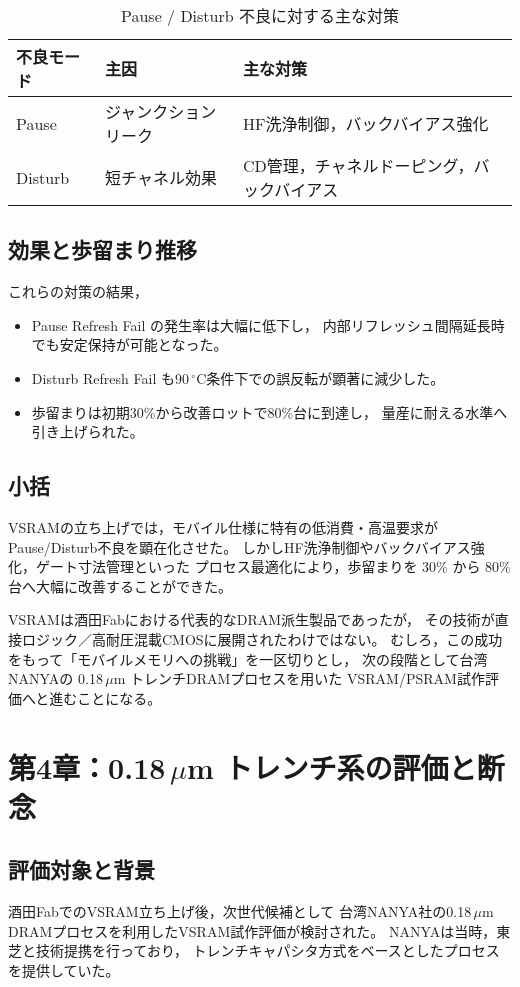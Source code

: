 \documentclass[conference]{IEEEtran}
\begin{document}
\begin{table}[t]
\centering
\caption{Pause / Disturb 不良に対する主な対策}
\begin{tabular}{lll}
\toprule
不良モード & 主因 & 主な対策 \\
\midrule
Pause & ジャンクションリーク & HF洗浄制御，バックバイアス強化 \\
Disturb & 短チャネル効果 & CD管理，チャネルドーピング，バックバイアス \\
\bottomrule
\end{tabular}
\end{table}

\subsection{効果と歩留まり推移}
これらの対策の結果，
\begin{itemize}
  \item Pause Refresh Fail の発生率は大幅に低下し，
        内部リフレッシュ間隔延長時でも安定保持が可能となった。
  \item Disturb Refresh Fail も90\,$^\circ$C条件下での誤反転が顕著に減少した。
  \item 歩留まりは初期30\%から改善ロットで80\%台に到達し，
        量産に耐える水準へ引き上げられた。
\end{itemize}

\subsection{小括}
VSRAMの立ち上げでは，モバイル仕様に特有の低消費・高温要求が
Pause/Disturb不良を顕在化させた。
しかしHF洗浄制御やバックバイアス強化，ゲート寸法管理といった
プロセス最適化により，歩留まりを 30\% から 80\%台へ大幅に改善することができた。

VSRAMは酒田Fabにおける代表的なDRAM派生製品であったが，
その技術が直接ロジック／高耐圧混載CMOSに展開されたわけではない。
むしろ，この成功をもって「モバイルメモリへの挑戦」を一区切りとし，
次の段階として台湾NANYAの 0.18\,$\mu$m トレンチDRAMプロセスを用いた
VSRAM/PSRAM試作評価へと進むことになる。

\section{第4章：0.18\,\texorpdfstring{$\mu$m}{μm} トレンチ系の評価と断念}

\subsection{評価対象と背景}
酒田FabでのVSRAM立ち上げ後，次世代候補として
台湾NANYA社の0.18\,$\mu$m DRAMプロセスを利用したVSRAM試作評価が検討された。
NANYAは当時，東芝と技術提携を行っており，
トレンチキャパシタ方式をベースとしたプロセスを提供していた。
\end{document}
